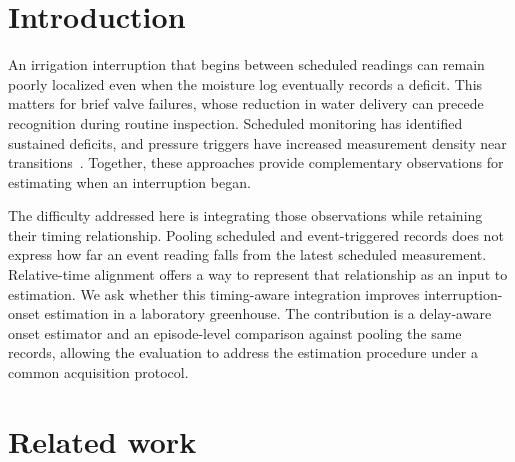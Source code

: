 \begin{abstract}
Brief valve failures can interrupt greenhouse irrigation before routine inspection detects them. Scheduled moisture measurements provide sparse observations around these transitions, while event-triggered pressure readings arrive asynchronously. Their timing relationship may therefore be informative for estimating onset. We evaluate a delay-aware onset estimator that aligns observations to the latest scheduled moisture reading and incorporates elapsed time into onset prediction. Training used 18 controlled episodes, with 12 further episodes held out. The aligned estimator achieved a mean absolute onset error of 6.4~s, compared with 9.1~s for a pooling comparator using identical records. This observed improvement supports the full estimation procedure within the laboratory protocol.
\end{abstract}

\section{Introduction}
An irrigation interruption that begins between scheduled readings can remain poorly localized even when the moisture log eventually records a deficit. This matters for brief valve failures, whose reduction in water delivery can precede recognition during routine inspection. Scheduled monitoring has identified sustained deficits, and pressure triggers have increased measurement density near transitions~\cite{routine2022,event2023}. Together, these approaches provide complementary observations for estimating when an interruption began.

The difficulty addressed here is integrating those observations while retaining their timing relationship. Pooling scheduled and event-triggered records does not express how far an event reading falls from the latest scheduled measurement. Relative-time alignment offers a way to represent that relationship as an input to estimation. We ask whether this timing-aware integration improves interruption-onset estimation in a laboratory greenhouse. The contribution is a delay-aware onset estimator and an episode-level comparison against pooling the same records, allowing the evaluation to address the estimation procedure under a common acquisition protocol.

\section{Related work}
